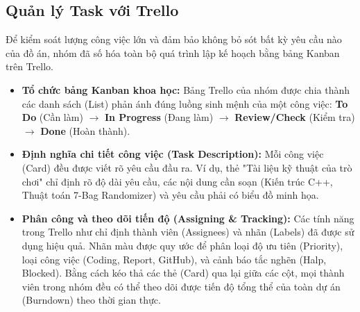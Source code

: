 \subsection{Quản lý Task với Trello}
Để kiểm soát lượng công việc lớn và đảm bảo không bỏ sót bất kỳ yêu cầu nào của đồ án, nhóm đã số hóa toàn bộ quá trình lập kế hoạch bằng bảng Kanban trên Trello.
\begin{itemize}
    \item \textbf{Tổ chức bảng Kanban khoa học:} Bảng Trello của nhóm được chia thành các danh sách (List) phản ánh đúng luồng sinh mệnh của một công việc: \textbf{To Do} (Cần làm) $\rightarrow$ \textbf{In Progress} (Đang làm) $\rightarrow$ \textbf{Review/Check} (Kiểm tra) $\rightarrow$ \textbf{Done} (Hoàn thành).
    \item \textbf{Định nghĩa chi tiết công việc (Task Description):} Mỗi công việc (Card) đều được viết rõ yêu cầu đầu ra. Ví dụ, thẻ "Tài liệu kỹ thuật của trò chơi" chỉ định rõ độ dài yêu cầu, các nội dung cần soạn (Kiến trúc C++, Thuật toán 7-Bag Randomizer) và yêu cầu phải có biểu đồ minh họa.
    \item \textbf{Phân công và theo dõi tiến độ (Assigning \& Tracking):} Các tính năng trong Trello như chỉ định thành viên (Assignees) và nhãn (Labels) đã được sử dụng hiệu quả. Nhãn màu được quy ước để phân loại độ ưu tiên (Priority), loại công việc (Coding, Report, GitHub), và cảnh báo tắc nghẽn (Halp, Blocked). Bằng cách kéo thả các thẻ (Card) qua lại giữa các cột, mọi thành viên trong nhóm đều có thể theo dõi được tiến độ tổng thể của toàn dự án (Burndown) theo thời gian thực.
\end{itemize}
